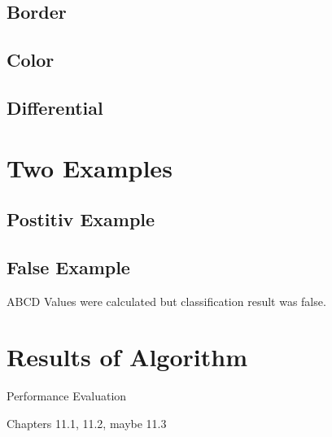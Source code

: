\subsection{Border}
\subsection{Color}
\subsection{Differential}

\section{Two Examples}
\subsection{Postitiv Example}

\subsection{False Example}

ABCD Values were calculated but classification result was false.

\section{Results of Algorithm}

Performance Evaluation

Chapters 11.1, 11.2, maybe 11.3